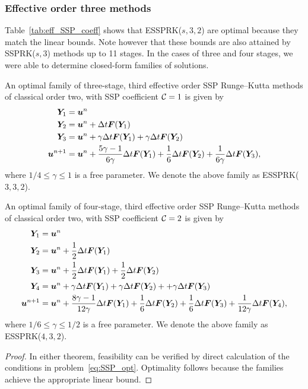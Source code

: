 \subsubsection{Effective order three methods}\label{subsubsec:3rd_ESSPRK}
Table~\ref{tab:eff_SSP_coeff} shows that ESSPRK($s,3,2$) are 
optimal because they match the linear bounds. 
Note however that these bounds are also attained by SSPRK($s,3$) methods 
up to 11 stages. 
In the cases of three and four stages, we were able to determine closed-form 
families of solutions.
\begin{theorem}\label{thm:ESSPRK(3,3,2)}
	An optimal family of three-stage, third effective order SSP Runge--Kutta 
	methods of classical order two, with SSP coefficient $\mathcal{C}=1$ is given by
    \begin{displaymath}
    		\begin{split}
    			\bm{Y}_1 &= \bm{u}^n \\
    			\bm{Y}_2 &= \bm{u}^n + \Delta t\bm{F}(\bm{Y}_1) \\
    			\bm{Y}_3 &= \bm{u}^n + \gamma\Delta t\bm{F}(\bm{Y}_1) + \gamma\Delta t\bm{F}(\bm{Y}_2) \\
    			\bm{u}^{n+1} &= \bm{u}^n + \frac{5\gamma-1}{6\gamma}\Delta t\bm{F}(\bm{Y}_1) + \frac{1}{6}\Delta t\bm{F}(\bm{Y}_2) + \frac{1}{6\gamma}\Delta t\bm{F}(\bm{Y}_3),
        \end{split}
    \end{displaymath}
    where $1/4 \leq \gamma \leq 1$ is a free parameter. We denote the above family as 
    ESSPRK($3,3,2$).
\end{theorem}
\begin{theorem}\label{thm:ESSPRK(4,3,2)}
	An optimal family of four-stage, third effective order SSP Runge--Kutta 
	methods of classical order two, with SSP coefficient $\mathcal{C}=2$ is given by
    \begin{displaymath}
    		\begin{split}
    			\bm{Y}_1 &= \bm{u}^n \\
    			\bm{Y}_2 &= \bm{u}^n + \frac{1}{2}\Delta t\bm{F}(\bm{Y}_1) \\
    			\bm{Y}_3 &= \bm{u}^n + \frac{1}{2}\Delta t\bm{F}(\bm{Y}_1) + \frac{1}{2}\Delta t\bm{F}(\bm{Y}_2) \\
    			\bm{Y}_4 &= \bm{u}^n + \gamma\Delta t\bm{F}(\bm{Y}_1) + \gamma\Delta t\bm{F}(\bm{Y}_2) + + \gamma\Delta t\bm{F}(\bm{Y}_3) \\
    			\bm{u}^{n+1} &= \bm{u}^n + \frac{8\gamma-1}{12\gamma}\Delta t\bm{F}(\bm{Y}_1) + \frac{1}{6}\Delta t\bm{F}(\bm{Y}_2) + \frac{1}{6}\Delta t\bm{F}(\bm{Y}_3) + \frac{1}{12\gamma}\Delta t\bm{F}(\bm{Y}_4),
        \end{split}
    \end{displaymath}
    where $ 1/6 \leq \gamma \leq 1/2 $ is a free parameter. We denote the 
    above family as ESSPRK($4,3,2$).
\end{theorem}
\begin{proof}
	In either theorem, feasibility can be verified by direct calculation of the 
	conditions in problem~\eqref{eq:SSP_opt}. Optimality follows because 
	the families achieve the appropriate linear bound.
\end{proof}

